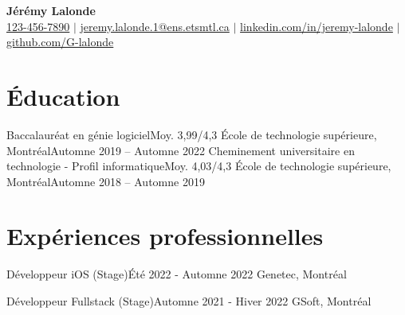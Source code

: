 \documentclass[letterpaper,11pt]{article}
\begin{document}
\begin{center}
  \textbf{\Huge J\'er\'emy Lalonde} \\ \vspace{5pt}
  \small \href{tel:+11234567890}{123-456-7890} $|$ \href{mailto:jeremy.lalonde.1@ens.etsmtl.ca}{jeremy.lalonde.1@ens.etsmtl.ca} $|$
  \href{https://linkedin.com/in/jeremy-lalonde}{linkedin.com/in/jeremy-lalonde} $|$
  \href{https://github.com/G-lalonde}{github.com/G-lalonde} \\ 
  \vspace{3pt}
\end{center}

\section{\'Education}
\resumeSubHeadingListStart
\resumeSubheadingFour
{Baccalaur\'eat en g\'enie logiciel}{Moy. 3,99/4,3}
{\'Ecole de technologie sup\'erieure, Montr\'eal}{Automne 2019 -- Automne 2022}
\resumeSubheadingFour
{Cheminement universitaire en technologie - Profil informatique}{Moy. 4,03/4,3}
{\'Ecole de technologie sup\'erieure, Montr\'eal}{Automne 2018 -- Automne 2019}
\resumeSubHeadingListEnd

\vspace{1pt}
\section{Exp\'eriences professionnelles}
\resumeSubHeadingListStart

\resumeSubheadingThree
{D\'eveloppeur iOS (Stage)}{\'Et\'e 2022 - Automne 2022}
{Genetec, Montr\'eal}
\resumeItemListStart
{}
\resumeItemListEnd

\resumeSubheadingThree
{D\'eveloppeur Fullstack (Stage)}{Automne 2021 - Hiver 2022}
{GSoft, Montr\'eal}
\resumeItemListStart
{}
\resumeItemListEnd
\end{document}
